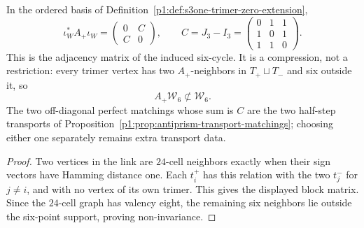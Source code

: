\documentclass[11pt]{article}
\begin{document}
\begin{proposition}
\label{p1:prop:s3one-trimer-adjacency-compression}
In the ordered basis of
Definition~\ref{p1:def:s3one-trimer-zero-extension},
\[
 \iota_W^*A_+\iota_W
 =\begin{pmatrix}0&C\\ C&0\end{pmatrix},
 \qquad
 C=J_3-I_3
 =\begin{pmatrix}0&1&1\\1&0&1\\1&1&0\end{pmatrix}.
\]
This is the adjacency matrix of the induced six-cycle.  It is a compression,
not a restriction: every trimer vertex has two \(A_+\)-neighbors in
\(T_+\sqcup T_-\) and six outside it, so
\[
 A_+\mathcal W_6\not\subset\mathcal W_6.
\]
The two off-diagonal perfect matchings whose sum is \(C\) are the two
half-step transports of
Proposition~\ref{p1:prop:antiprism-transport-matchings}; choosing either one
separately remains extra transport data.
\end{proposition}

\begin{proof}
Two vertices in the link are \(24\)-cell neighbors exactly when their sign
vectors have Hamming distance one.  Each \(t_i^+\) has this relation with
the two \(t_j^-\) for \(j\ne i\), and with no vertex of its own trimer.  This
gives the displayed block matrix.  Since the \(24\)-cell graph has valency
eight, the remaining six neighbors lie outside the six-point support, proving
non-invariance.
\end{proof}
\end{document}
